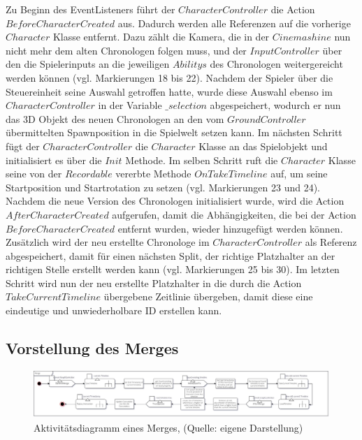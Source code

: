 Zu Beginn des EventListeners führt der $CharacterController$ die Action \\ $BeforeCharacterCreated$ aus. Dadurch werden alle Referenzen auf die vorherige $Character$ Klasse entfernt. Dazu zählt die Kamera, die in der $Cinemashine$ nun nicht mehr dem alten Chronologen folgen muss, und der $InputController$ über den die Spielerinputs an die jeweiligen $Abilitys$ des Chronologen weitergereicht werden können (vgl. Markierungen 18 bis 22). Nachdem der Spieler über die Steuereinheit seine Auswahl getroffen hatte, wurde diese Auswahl ebenso im $CharacterController$ in der Variable $\_selection$ abgespeichert, wodurch er nun das \ac{3D} Objekt des neuen Chronologen an den vom $GroundController$ übermittelten Spawnposition in die Spielwelt setzen kann. Im nächsten Schritt fügt der $CharacterController$ die $Character$ Klasse an das Spielobjekt und initialisiert es über die $Init$ Methode. Im selben Schritt ruft die $Character$ Klasse seine von der $Recordable$ vererbte Methode $OnTakeTimeline$ auf, um seine Startposition und Startrotation zu setzen (vgl. Markierungen 23 und 24). Nachdem die neue Version des Chronologen initialisiert wurde, wird die Action $AfterCharacterCreated$ aufgerufen, damit die Abhängigkeiten, die bei der Action $BeforeCharacterCreated$ entfernt wurden, wieder hinzugefügt werden können. Zusätzlich wird der neu erstellte Chronologe im $CharacterController$ als Referenz abgespeichert, damit für einen nächsten Split, der richtige Platzhalter an der richtigen Stelle erstellt werden kann (vgl. Markierungen 25 bis 30). Im letzten Schritt wird nun der neu erstellte Platzhalter in die durch die Action $TakeCurrentTimeline$ übergebene Zeitlinie übergeben, damit diese eine eindeutige und unwiederholbare \ac{ID} erstellen kann.

\subsection{Vorstellung des Merges}\label{sec:merge_prototype}

\begin{figure}[ht]
\centering
\includegraphics[width=1\linewidth]{content/pictures/Merge_uml.jpg}
\caption{Aktivitätsdiagramm eines Merges, (Quelle: eigene Darstellung)}
\label{fig:merge-uml}
\end{figure}

